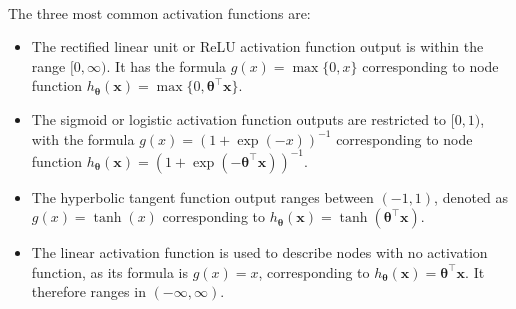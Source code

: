 \documentclass[a4paper,12pt]{article}
\numberwithin{equation}{section}
\begin{document}
\\
The three most common activation functions are:
\begin{itemize}
\item The rectified linear unit or ReLU activation function output is within the range $[0,\infty)$. It has the formula $g(x)=\max\{0,x\}$ corresponding to node function $h_{\bm{\theta}}(\textbf{x})=\max\{0,\bm{\theta}^\top\textbf{x}\}$.
\item The sigmoid or logistic activation function outputs are restricted to $[0,1)$, with the formula $g(x)=(1+\exp(-x))^{-1}$ corresponding to node function  $h_{\bm{\theta}}(\textbf{x})=(1+\exp(-\bm{\theta}^\top\textbf{x}))^{-1}$.
\item The hyperbolic tangent function output ranges between $(-1,1)$, denoted as $g(x)=\tanh(x)$ corresponding to $h_{\bm{\theta}}(\textbf{x})=\tanh(\bm{\theta}^\top\textbf{x})$.
\item The linear activation function is used to describe nodes with no activation function, as its formula is $g(x)=x$, corresponding to $h_{\bm{\theta}}(\textbf{x})=\bm{\theta}^\top\textbf{x}$. It therefore ranges in $(-\infty, \infty)$.
\end{itemize}
\end{document}
